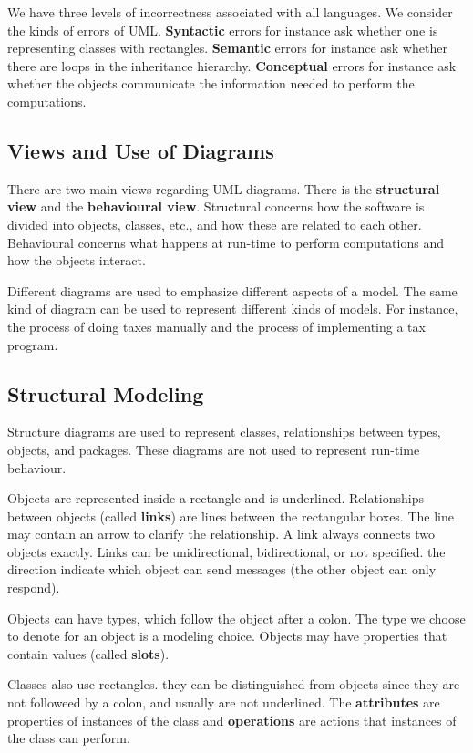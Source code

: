 \documentclass[11pt]{article}
\theoremstyle{plain} %
\theoremstyle{definition}
\theoremstyle{example}
\theoremstyle{remark}
\begin{document}
We have three levels of incorrectness associated with all languages. We consider the kinds of errors of UML. \textbf{Syntactic} errors for instance ask whether one is representing classes with rectangles. \textbf{Semantic} errors for instance ask whether there are loops in the inheritance hierarchy. \textbf{Conceptual} errors for instance ask whether the objects communicate the information needed to perform the computations. 

\subsection{Views and Use of Diagrams}

There are two main views regarding UML diagrams. There is the \textbf{structural view} and the \textbf{behavioural view}. Structural concerns how the software is divided into objects, classes, etc., and how these are related to each other. Behavioural concerns what happens at run-time to perform computations and how the objects interact. 

Different diagrams are used to emphasize different aspects of a model. The same kind of diagram can be used to represent different kinds of models. For instance, the process of doing taxes manually and the process of implementing a tax program.


\subsection{Structural Modeling}

Structure diagrams are used to represent classes, relationships between types, objects, and packages. These diagrams are not used to represent run-time behaviour. 

Objects are represented inside a rectangle and is underlined. Relationships between objects (called \textbf{links}) are lines between the rectangular boxes. The line may contain an arrow to clarify the relationship. A link always connects two objects exactly. Links can be unidirectional, bidirectional, or not specified. the direction indicate which object can send messages (the other object can only respond).

Objects can have types, which follow the object after a colon. The type we choose to denote for an object is a modeling choice. Objects may have properties that contain values (called \textbf{slots}).

Classes also use rectangles. they can be distinguished from objects since they are not followeed by a colon, and usually are not underlined. The \textbf{attributes} are properties of instances of the class and \textbf{operations} are actions that instances of the class can perform. 
\end{document}
